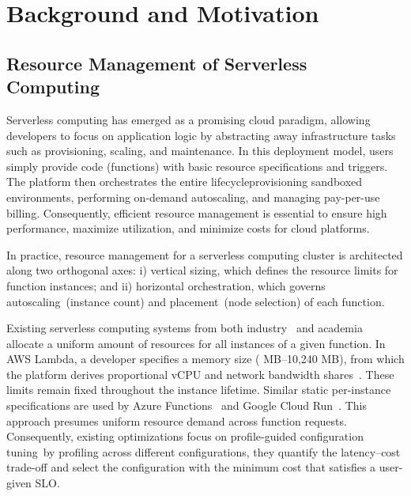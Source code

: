 \vspace{-7pt}
\section{Background and Motivation}
\label{sec:background}

\subsection{Resource Management of Serverless Computing}
\label{sec:background:resource-management}

Serverless computing has emerged as a promising cloud paradigm, allowing developers to focus on application logic by abstracting away infrastructure tasks such as provisioning, scaling, and maintenance. In this deployment model, users simply provide code (functions) with basic resource specifications and triggers. The platform then orchestrates the entire lifecycle\textemdash provisioning sandboxed environments, performing on-demand autoscaling, and managing pay-per-use billing. Consequently, efficient resource management is essential to ensure high performance, maximize utilization, and minimize costs for cloud platforms.

In practice, resource management for a serverless computing cluster is architected along two orthogonal axes: i) vertical sizing, which defines the resource limits for function instances; and ii) horizontal orchestration, which governs autoscaling~(instance count) and placement~(node selection) of each function.

Existing serverless computing systems from both industry~\cite{Doc:Azure_Functions_Hosting,
Doc:GCP_CloudRun_Mem, Doc:AWS_Lambda_Mem} and academia~\cite{FaaSCache, ShahradFGCBCLTR20, wang2018peeking, pu2019shuffling}
allocate a uniform amount of resources for all instances of a given function. In AWS Lambda, a developer specifies a memory size ( MB--10,240 MB), from which the platform derives proportional vCPU and network bandwidth shares~\cite{Doc:AWS_Lambda_Mem}. 
These limits remain fixed throughout the instance lifetime. Similar static per-instance specifications are used by Azure Functions~\cite{Doc:Azure_Functions_Hosting} and Google Cloud Run~\cite{Doc:GCP_CloudRun_Mem}. This approach presumes uniform resource demand across function requests. Consequently, existing optimizations focus on profile-guided configuration tuning~\cite{aws_lambda_power_tuning,FaaSCache, ShahradFGCBCLTR20, zhang2024jolteon, JinZXZHLJ23}\textemdash by profiling across different configurations, they quantify the latency–cost trade-off and select the configuration with the minimum cost that satisfies a user-given SLO.


